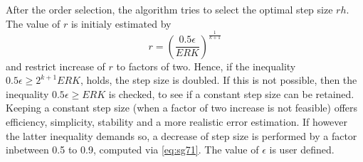 After the order selection, the algorithm tries to select the optimal step size $rh$. 
The value of $r$ is initialy estimated by
\begin{equation}\label{eq:sg71}
  r = \left( \frac{0.5 \epsilon}{ERK} \right) ^{\frac{1}{k+1}}
\end{equation}
and restrict increase of $r$ to factors of two. Hence, if the inequality 
$0.5 \epsilon \ge 2^{k+1}ERK$, holds, the step size is doubled. If this is not 
possible, then the inequality $0.5 \epsilon \ge ERK$ is checked, to see if a constant 
step size can be retained. Keeping a constant step size (when a factor of two 
increase is not feasible) offers efficiency, simplicity, stability and a more 
realistic error estimation. If however the latter inequality demands so, a decrease 
of step size is performed by a factor inbetween 0.5 to 0.9, computed via \autoref{eq:sg71}.
The value of $\epsilon$ is user defined.




